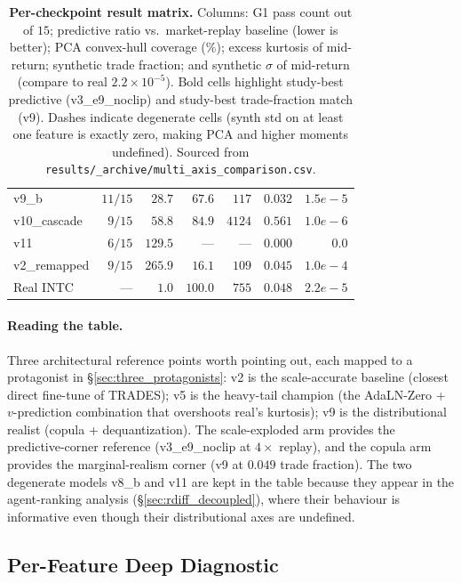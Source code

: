 \documentclass[journal]{IEEEtran}
\theoremstyle{definition}   %
\begin{document}
\begin{table}[ht]
\begin{tabular}{lrrrrrr}
        v9\_b        & $11/15$ & $28.7$  & $67.6$ & $117$  & $0.032$ & $1.5e{-}5$ \\
        v10\_cascade & $9/15$  & $58.8$  & $84.9$ & $4124$ & $0.561$ & $1.0e{-}6$ \\
        v11          & $6/15$  & $129.5$ & ---    & ---    & $0.000$ & $0.0$ \\
        v2\_remapped & $9/15$  & $265.9$ & $16.1$ & $109$  & $0.045$ & $1.0e{-}4$ \\
        \midrule
        Real INTC & --- & $1.0$ & $100.0$ & $755$ & $0.048$ & $2.2e{-}5$ \\
        \bottomrule
    \end{tabular}
    \caption{\textbf{Per-checkpoint result matrix.} Columns: G1
    pass count out of $15$; predictive ratio vs.\ market-replay
    baseline (lower is better); PCA convex-hull coverage (\%);
    excess kurtosis of mid-return; synthetic trade fraction; and
    synthetic $\sigma$ of mid-return (compare to real
    $2.2 \times 10^{-5}$). Bold cells highlight study-best
    predictive (v3\_e9\_noclip) and study-best trade-fraction
    match (v9). Dashes indicate degenerate cells (synth std on at
    least one feature is exactly zero, making PCA and higher
    moments undefined). Sourced from
    \texttt{results/\_archive/multi\_axis\_comparison.csv}.}
    \label{tab:checkpoint_metrics}
\end{table}

\paragraph{Reading the table.}
Three architectural reference points worth pointing out, each
mapped to a protagonist in \S\ref{sec:three_protagonists}: v2 is
the scale-accurate baseline (closest direct fine-tune of TRADES);
v5 is the heavy-tail champion (the AdaLN-Zero + $v$-prediction
combination that overshoots real's kurtosis); v9 is the
distributional realist (copula + dequantization). The
scale-exploded arm provides the predictive-corner reference
(v3\_e9\_noclip at $4\times$ replay), and the copula arm provides
the marginal-realism corner (v9 at $0.049$ trade fraction). The
two degenerate models v8\_b and v11 are kept in the table because
they appear in the agent-ranking analysis (\S\ref{sec:rdiff_decoupled}),
where their behaviour is informative even though their
distributional axes are undefined.

\subsection{Per-Feature Deep Diagnostic}
\label{app:deep_diagnostic}
\end{document}
